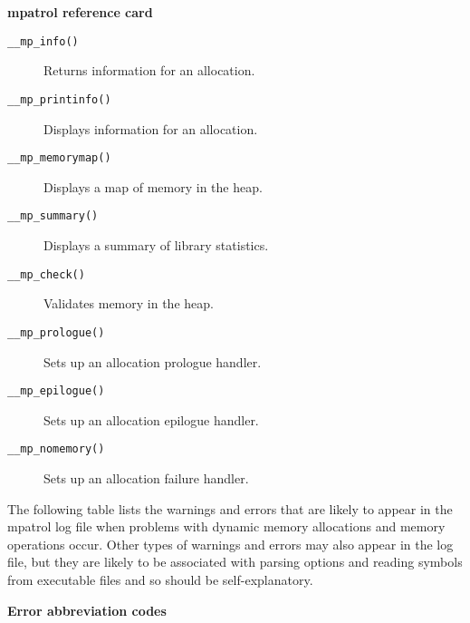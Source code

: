 \documentclass[a4paper,landscape,final]{article}
\newcommand{\heading}[1]{\textbf{\normalsize #1}}
\newcommand{\function}[1]{\texttt{#1()}}
\begin{document}
\begin{multicols}{3}{\textbf{\Large mpatrol reference card}}
\begin{description}
\item[\function{\_\_mp\_info}]
\hfill Returns information for an allocation.
\item[\function{\_\_mp\_printinfo}]
\hfill Displays information for an allocation.
\item[\function{\_\_mp\_memorymap}]
\hfill Displays a map of memory in the heap.
\item[\function{\_\_mp\_summary}]
\hfill Displays a summary of library statistics.
\item[\function{\_\_mp\_check}]
\hfill Validates memory in the heap.
\item[\function{\_\_mp\_prologue}]
\hfill Sets up an allocation prologue handler.
\item[\function{\_\_mp\_epilogue}]
\hfill Sets up an allocation epilogue handler.
\item[\function{\_\_mp\_nomemory}]
\hfill Sets up an allocation failure handler.
\end{description}

\vskip 12pt

The following table lists the warnings and errors that are likely to appear in
the mpatrol log file when problems with dynamic memory allocations and memory
operations occur.  Other types of warnings and errors may also appear in the log
file, but they are likely to be associated with parsing options and reading
symbols from executable files and so should be self-explanatory.

\vskip 12pt
\heading{Error abbreviation codes}
\vskip 6pt


\end{multicols}
\end{document}
